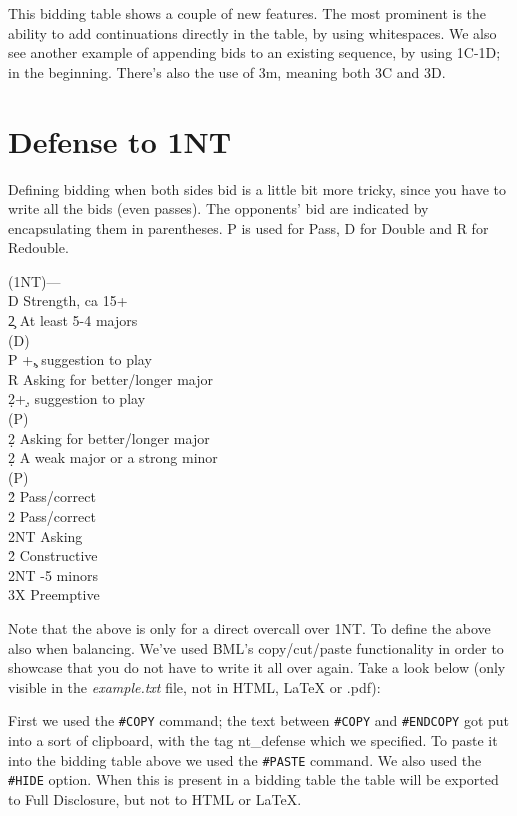\documentclass[a4paper]{article}
\begin{document}
This bidding table shows a couple of new features. The most
prominent is the ability to add continuations directly in the
table, by using whitespaces. We also see another example of
appending bids to an existing sequence, by using 1C-1D; in the
beginning. There's also the use of 3m, meaning both 3C and 3D.

\section{Defense to 1NT}

Defining bidding when both sides bid is a little bit more tricky,
since you have to write all the bids (even passes). The opponents'
bid are indicated by encapsulating them in parentheses. P is used
for Pass, D for Double and R for Redouble.

\begin{bidtable}
(1NT)---\\
D \> Strength, ca 15+\\
2\c \> At least 5-4 majors\+\\
(D)\+\\
P +\c, suggestion to play\\
R \> Asking for better/longer major\\
2\d {}+\d, suggestion to play\-\\
(P)\+\\
2\d \> Asking for better/longer major\-\-\\
2\d \> A weak major or a strong minor\+\\
(P)\+\\
2\h \> Pass/correct\\
2\s \> Pass/correct\\
2NT \> Asking\-\-\\
2\h\s \> Constructive\\
2NT -5 minors\\
3X \> Preemptive
\end{bidtable}

Note that the above is only for a direct overcall over 1NT. To
define the above also when balancing. We've used BML's
copy/cut/paste functionality in order to showcase that you do not
have to write it all over again. Take a look below (only visible in
the \emph{example.txt} file, not in HTML, LaTeX or .pdf):

First we used the \texttt{\#COPY} command; the text between \texttt{\#COPY} and \texttt{\#ENDCOPY}
got put into a sort of clipboard, with the tag nt\_defense which we
specified. To paste it into the bidding table above we used
the \texttt{\#PASTE} command. We also used the \texttt{\#HIDE} option. When this is
present in a bidding table the table will be exported to Full
Disclosure, but not to HTML or LaTeX.
\end{document}
